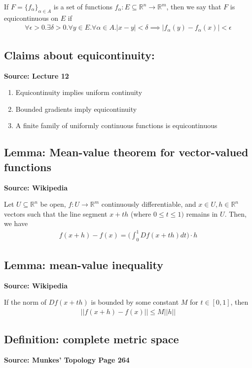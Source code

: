 \documentclass[11pt]{article}
\newcommand{\R}{\mathbb{R}}
\begin{document}
If $F = \{f_\alpha\}_{\alpha \in A}$ is a set of functions $f_\alpha: E \subseteq \R^n \to \R^m$, then we say that $F$ is equicontinuous on $E$ if 
\begin{align*}
    \forall \epsilon > 0 .\exists \delta > 0. \forall y \in E. \forall \alpha \in A. |x-y| < \delta \implies |f_\alpha(y) - f_\alpha(x)| < \epsilon 
\end{align*}

\subsection{Claims about equicontinuity:}
\textbf{Source: Lecture 12}
\begin{enumerate}
    \item Equicontinuity implies uniform continuity 
    \item Bounded gradients imply equicontinuity
    \item A finite family of uniformly continuous functions is equicontinuous
\end{enumerate}

\subsection{Lemma: Mean-value theorem for vector-valued functions}
\textbf{Source: Wikipedia}

Let $U \subseteq \R^n$ be open, $f: U \to \R^m$ continuously differentiable, and $x \in U, h \in \R^n$ vectors such that the line segment $x+th$ (where $0 \leq t \leq 1)$ remains in $U$. Then, we have
\begin{align*}
    f(x+h) - f(x) = \Big(\int_0^1 Df(x+th) dt \Big) \cdot h
\end{align*}

\subsection{Lemma: mean-value inequality}
\textbf{Source: Wikipedia}

If the norm of $Df(x+th)$ is bounded by some constant $M$ for $t \in [0,1]$, then 
\begin{align*}
    ||f(x+h) - f(x) || \leq M ||h|| 
\end{align*}

\subsection{Definition: complete metric space}
\textbf{Source: Munkes' Topology Page 264}
\end{document}
